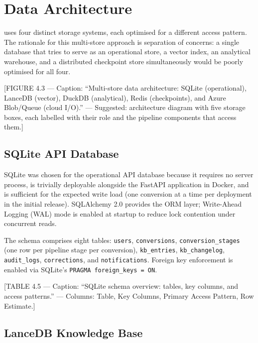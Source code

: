 \section{Data Architecture}
\label{sec:data-architecture}

\codara{} uses four distinct storage systems, each optimised for a different
access pattern. The rationale for this multi-store approach is separation of
concerns: a single database that tries to serve as an operational store, a
vector index, an analytical warehouse, and a distributed checkpoint store
simultaneously would be poorly optimised for all four.

[FIGURE 4.3 --- Caption: ``Multi-store data architecture: SQLite (operational),
LanceDB (vector), DuckDB (analytical), Redis (checkpoints), and Azure Blob/Queue
(cloud I/O).'' --- Suggested: architecture diagram with five storage boxes,
each labelled with their role and the pipeline components that access them.]

\subsection{SQLite API Database}
\label{subsec:sqlite-schema}

SQLite was chosen for the operational API database because it requires no server
process, is trivially deployable alongside the FastAPI application in Docker,
and is sufficient for the expected write load (one conversion at a time per
deployment in the initial release). SQLAlchemy 2.0 provides the ORM layer;
Write-Ahead Logging (WAL) mode is enabled at startup to reduce lock contention
under concurrent reads.

The schema comprises eight tables: \texttt{users}, \texttt{conversions},
\texttt{conversion\_stages} (one row per pipeline stage per conversion),
\texttt{kb\_entries}, \texttt{kb\_changelog}, \texttt{audit\_logs},
\texttt{corrections}, and \texttt{notifications}. Foreign key enforcement is
enabled via SQLite's \texttt{PRAGMA foreign\_keys = ON}.

[TABLE 4.5 --- Caption: ``SQLite schema overview: tables, key columns, and
access patterns.'' --- Columns: Table, Key Columns, Primary Access Pattern,
Row Estimate.]

\subsection{LanceDB Knowledge Base}
\label{subsec:lancedb-schema}

